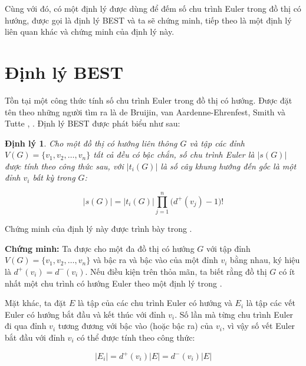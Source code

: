 \documentclass[14pt, a4paper]{article}
\numberwithin{equation}{section}
\numberwithin{figure}{section}
\newtheorem{dl}{Định lý}
\numberwithin{dl}{section}
\numberwithin{md}{section}
\numberwithin{bd}{section}
\numberwithin{dn}{section}
\numberwithin{hq}{section}
\begin{document}
    Cùng với đó, có một định lý được dùng để đếm số chu trình Euler trong đồ thị có hướng, được gọi là định lý BEST và ta sẽ chứng minh, tiếp theo là một định lý liên quan khác và chứng minh của định lý này.

    \section{Định lý BEST}

    Tồn tại một công thức tính số chu trình Euler trong đồ thị có hướng.
    Được đặt tên theo những người tìm ra là de Bruijin, van Aardenne-Ehrenfest, Smith và Tutte \cite{van1951circuits}, \cite{tutte1941unicursal}.
    Định lý BEST được phát biểu như sau:

    \begin{dl}
        Cho một đồ thị có hướng liên thông $G$ và tập các đỉnh $V(G)=\lbrace v_1, v_2, \dots, v_n \rbrace$ tất cả đều có bậc chắn, số chu trình Euler là $\lvert s(G) \rvert$ được tính theo công thức sau, với $\lvert t_i (G) \rvert$ là số cây khung hướng đến gốc là một đỉnh $v_i$ bất kỳ trong $G$:

        \begin{equation*}
            \lvert s(G) \rvert = \lvert t_i (G) \rvert \prod_{j=1}^n \big( d^+ (v_j) - 1 \big)!
        \end{equation*}
    \end{dl}

    Chứng minh của định lý này được trình bày trong \cite{bollobas1998graduate}.

    \textbf{Chứng minh:}
    Ta được cho một đa đồ thị có hướng $G$ với tập đỉnh $V(G)=\lbrace v_1, v_2, \dots, v_n \rbrace$ và bậc ra và bậc vào của một đỉnh $v_i$ bằng nhau, ký hiệu là $d^+ (v_i) = d^- (v_i)$.
    Nếu điều kiện trên thỏa mãn, ta biết rằng đồ thị $G$ có ít nhất một chu trình có hướng Euler theo một định lý trong \cite{bollobas1998graduate}.

    Mặt khác, ta đặt $E$ là tập của các chu trình Euler có hướng và $E_i$ là tập các vết Euler có hướng bắt đầu và kết thúc với đỉnh $v_i$.
    Số lần mà từng chu trình Euler đi qua đỉnh $v_i$ tương đương với bậc vào (hoặc bậc ra) của $v_i$, vì vậy số vết Euler bắt đầu với đỉnh $v_i$ có thể được tính theo công thức:

    \begin{equation}
        \lvert E_i \rvert = d^+ (v_i) \lvert E \rvert = d^- (v_i) \lvert E \rvert
    \end{equation}
\end{document}
